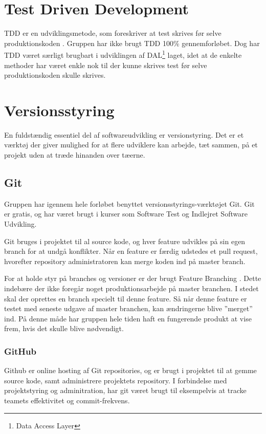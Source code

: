 \section{Test Driven Development}
TDD er en udviklingsmetode, som foreskriver at test skrives før selve produktionskoden \cite{osherove2015art}. Gruppen har ikke brugt TDD 100\% gennemforløbet. 
Dog har TDD været særligt brugbart i udviklingen af DAL\footnote{Data Access Layer} laget, idet at de enkelte methoder har været enkle nok til der kunne skrives test før selve produktionskoden skulle skrives.

\section{Versionsstyring}
En fuldstændig essentiel del af softwareudvikling er versionstyring. Det er et værktøj der giver mulighed for at flere udviklere kan arbejde, tæt sammen, på et projekt uden at træde hinanden over tæerne.

\subsection{Git}
Gruppen har igennem hele forløbet benyttet versionsstyrings-værktøjet Git. Git er gratis, og har været brugt i kurser som Software Test og Indlejret Software Udvikling. 

Git bruges i projektet til al source kode, og hver feature udvikles på sin egen branch for at undgå konflikter. Når en feature er færdig udstedes et pull request, hvorefter repository administratoren kan merge koden ind på master branch.

For at holde styr på branches og versioner er der brugt Feature Branching \cite{atlassian2016}. Dette indebære der ikke foregår noget produktionsarbejde på master branchen. I stedet skal der oprettes en branch specielt til denne feature. Så når denne feature er testet med seneste udgave af master branchen, kan ændringerne blive ''merget'' ind. På denne måde har gruppen hele tiden haft en fungerende produkt at vise frem, hvis det skulle blive nødvendigt.

\subsubsection{GitHub}
Github er online hosting af Git repositories, og er brugt i projektet til at gemme source kode, samt administrere projektets repository. I forbindelse med projektstyring og adminitration, har git været brugt til eksempelvis at tracke teamets effektivitet og commit-frekvens.

